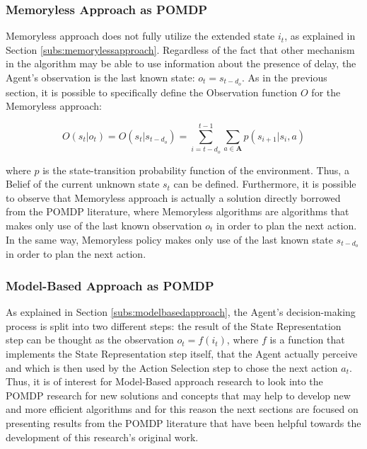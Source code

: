             \subsubsection{Memoryless Approach as POMDP}
                Memoryless approach does not fully utilize the extended state $i_t$, as explained in Section \ref{subs:memorylessapproach}. Regardless of the fact that other mechanism in the algorithm may be able to use information about the presence of delay, the Agent's observation is the last known state: $o_t = s_{t-d_o}$. As in the previous section, it is possible to specifically define the Observation function $O$ for the Memoryless approach:
                
                \[ O(s_t|o_t) = O(s_t|s_{t-d_o}) = \sum_{i = t - d_o}^{t-1} \sum_{a \in \mathbf{A}} p(s_{i+1}|s_{i}, a)\]
                
                where $p$ is the state-transition probability function of the environment. Thus, a Belief of the current unknown state $s_t$ can be defined. \newline
                Furthermore, it is possible to observe that Memoryless approach is actually a solution directly borrowed from the POMDP literature, where Memoryless algorithms are algorithms that makes only use of the last known observation $o_t$ in order to plan the next action. In the same way, Memoryless policy makes only use of the last known state $s_{t-d_o}$ in order to plan the next action.
            
            \subsubsection{Model-Based Approach as POMDP}
                As explained in Section \ref{subs:modelbasedapproach}, the Agent's decision-making process is split into two different steps: the result of the State Representation step can be thought as the observation $o_t = f (i_t)$, where $f$ is a function that implements the State Representation step itself, that the Agent actually perceive and which is then used by the Action Selection step to chose the next action $a_t$. \newline
                Thus, it is of interest for Model-Based approach research to look into the POMDP research for new solutions and concepts that may help to develop new and more efficient algorithms and for this reason the next sections are focused on presenting results from the POMDP literature that have been helpful towards the development of this research's original work.
                
